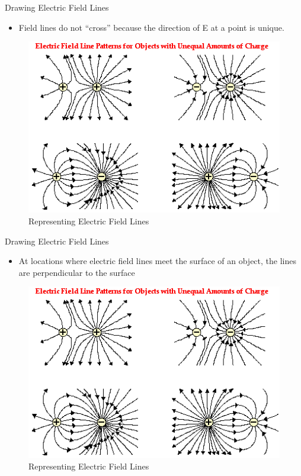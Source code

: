 \documentclass{beamer}
\begin{document}
\begin{frame}{Drawing Electric Field Lines}{}
  \begin{itemize}
	\item Field lines do not “cross” because the direction of E at a point is unique.
  \end{itemize}
\begin{figure}
\includegraphics[scale=0.45]{fieldlines}
\caption{Representing Electric Field Lines}
\end{figure}
\end{frame}

\begin{frame}{Drawing Electric Field Lines}{}
  \begin{itemize}
	\item  At locations where electric field lines meet the surface of an object, the lines are perpendicular to the surface
  \end{itemize}
\begin{figure}
\includegraphics[scale=0.45]{fieldlines}
\caption{Representing Electric Field Lines}
\end{figure}
\end{frame}
\end{document}
